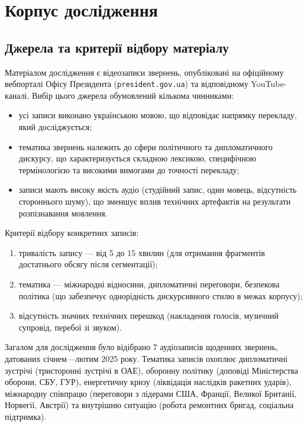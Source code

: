 \section{Корпус дослідження}
\label{sec:corpus}

\subsection{Джерела та критерії відбору матеріалу}

Матеріалом дослідження є відеозаписи звернень, опубліковані на офіційному вебпорталі Офісу Президента (\texttt{president.gov.ua}) та відповідному YouTube-каналі. Вибір цього
джерела обумовлений кількома чинниками:
\begin{itemize}[nosep]
    \item усі записи виконано українською мовою, що відповідає напрямку
    перекладу, який досліджується;
    \item тематика звернень належить до сфери політичного та дипломатичного
    дискурсу, що характеризується складною лексикою, специфічною термінологією
    та високими вимогами до точності перекладу;
    \item записи мають високу якість аудіо (студійний запис, один мовець,
    відсутність стороннього шуму), що зменшує вплив технічних артефактів
    на результати розпізнавання мовлення.
\end{itemize}

Критерії відбору конкретних записів:
\begin{enumerate}[nosep]
    \item тривалість запису --- від 5 до 15 хвилин (для отримання фрагментів
    достатнього обсягу після сегментації);
    \item тематика --- міжнародні відносини, дипломатичні переговори,
    безпекова політика (що забезпечує однорідність дискурсивного стилю
    в межах корпусу);
    \item відсутність значних технічних перешкод (накладення голосів,
    музичний супровід, перебої зі звуком).
\end{enumerate}

Загалом для дослідження було відібрано 7 аудіозаписів щоденних звернень, датованих січнем---лютим
2025 року. Тематика записів охоплює дипломатичні зустрічі (тристоронні
зустрічі в ОАЕ), оборонну політику (доповіді Міністерства оборони, СБУ, ГУР),
енергетичну кризу (ліквідація наслідків ракетних ударів), міжнародну співпрацю
(переговори з лідерами США, Франції, Великої Британії, Норвегії, Австрії) та
внутрішню ситуацію (робота ремонтних бригад, соціальна підтримка).

